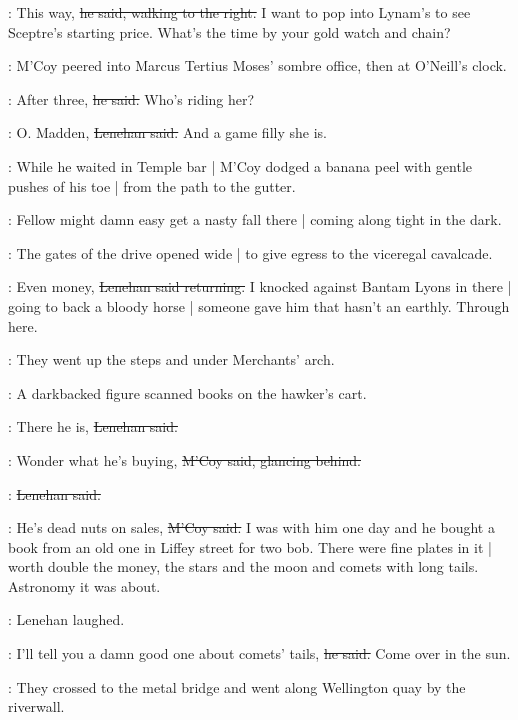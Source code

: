 \lenehan:
This way,
\sout{he said,
walking to the right.}
I want to pop into Lynam's
to see Sceptre's starting price.
What's the time by your gold watch and chain?

:
M'Coy peered into Marcus Tertius Moses' sombre office,
then at O'Neill's clock.

\mcoy:
After three,
\sout{he said.}%
Who's riding her?

\lenehan:
O. Madden,
\sout{Lenehan said.}
And a game filly she is.

:
While he waited in Temple bar |
M'Coy dodged a banana peel
with gentle pushes of his toe |
from the path
to the gutter.

\mcoy:
Fellow might damn
easy get a nasty fall there |
coming along tight in the dark.

\begin{interject}
    :
    The gates of the drive opened wide |
    to give egress to the viceregal cavalcade.
\end{interject}

\lenehan:
Even money,
\sout{Lenehan said returning.}
I knocked against Bantam Lyons in there |
going to back a bloody horse |
someone gave him that hasn't an earthly.
Through here.

:
They went up the steps and under Merchants' arch.%

\begin{interject}
    :
    A darkbacked figure scanned books on the hawker's cart.
\end{interject}

\lenehan:
There he is,
\sout{Lenehan said.}

\mcoy:
Wonder what he's buying,
\sout{M'Coy said,
glancing behind.}

\lenehan:
\sout{Lenehan said.}

\mcoy:
He's dead nuts on sales,
\sout{M'Coy said.}
I was with him one day
and he bought a book 
from an old one in Liffey street for two bob.
There were fine plates in it |
worth double the money,
the stars and the moon and comets with long tails.
Astronomy it was about.

:
Lenehan laughed.

\lenehan:
I'll tell you a damn good one about comets' tails,
\sout{he said.}%
Come over in the sun.

:
They crossed to the metal bridge
and went along Wellington quay by the riverwall.

